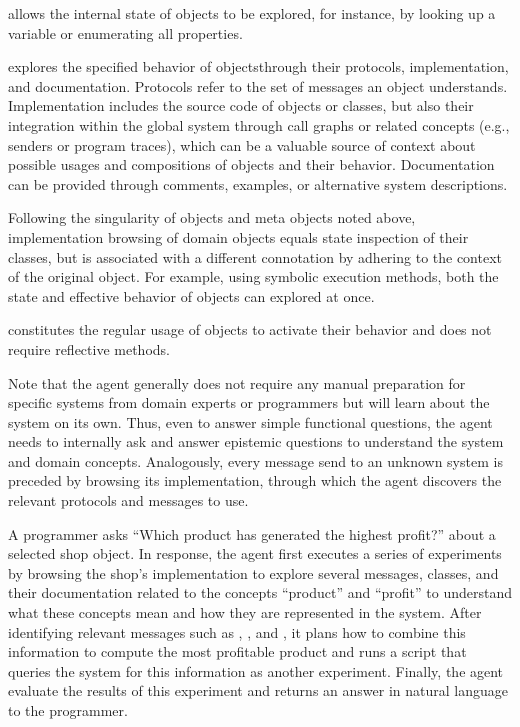 \begin{description}[noextralabelsep]
	\item[State inspection] allows the internal state of objects to be explored, for instance, by looking up a variable or enumerating all properties.
	\item[Implementation browsing] explores the specified behavior of objects\linebreak{}through their protocols, implementation, and documentation.
	Protocols refer to the set of messages an object understands.
	Implementation includes the source code of objects or classes, but also their integration within the global system through call graphs or related concepts (e.g., senders or program traces), which can be a valuable source of context about possible usages and compositions of objects and their behavior.
	Documentation can be provided through comments, examples, or alternative system descriptions.

	Following the singularity of objects and meta objects noted above, implementation browsing of domain objects equals state inspection of their classes, but is associated with a different connotation by adhering to the context of the original object.
	For example, using symbolic execution methods, both the state and effective behavior of objects can explored at once.
	\item[Message sending] constitutes the regular usage of objects to activate their behavior and does not require reflective methods.
\end{description}

Note that the agent generally does not require any manual preparation for specific systems from domain experts or programmers but will learn about the system on its own.
Thus, even to answer simple functional questions, the agent needs to internally ask and answer epistemic questions to understand the system and domain concepts.
Analogously, every message send to an unknown system is preceded by browsing its implementation, through which the agent discovers the relevant protocols and messages to use.

\begin{example}
	A programmer asks ``Which product has generated the highest profit?'' about a selected shop object.
	In response, the agent first executes a series of experiments by browsing the shop's implementation to explore several messages, classes, and their documentation related to the concepts ``product'' and ``profit'' to understand what these concepts mean and how they are represented in the system.
	After identifying relevant messages such as , , and , it plans how to combine this information to compute the most profitable product and runs a script that queries the system for this information as another experiment.
	Finally, the agent evaluate the results of this experiment and returns an answer in natural language to the programmer.
\end{example}

